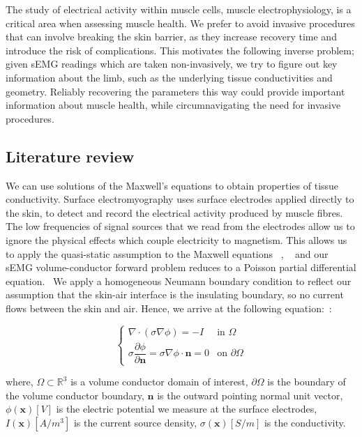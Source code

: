 \documentclass[final-report]{report-template}
\begin{document}
The study of electrical activity within muscle cells, muscle electrophysiology, is a critical area when assessing muscle health. We prefer to avoid invasive procedures that can involve breaking the skin barrier, as they increase recovery time and introduce the risk of complications. This motivates the following inverse problem; given sEMG readings which are taken non-invasively, we try to figure out key information about the limb, such as the underlying tissue conductivities and geometry. Reliably recovering the parameters this way could provide important information about muscle health, while circumnavigating the need for invasive procedures.

\subsection{Literature review}

We can use solutions of the Maxwell's equations to obtain properties of tissue conductivity. Surface electromyography uses surface electrodes applied directly to the skin, to detect and record the electrical activity produced by muscle fibres. The low frequencies of signal sources that we read from the electrodes allow us to ignore the physical effects which couple electricity to magnetism. This allows us to apply the quasi-static assumption to the Maxwell equations ~\cite{plonsey1977}, ~\cite{plonsey1967} and our sEMG volume-conductor forward problem reduces to a Poisson partial differential equation.~\cite{mesin2013} We apply a homogeneous Neumann boundary condition to reflect our assumption that the skin-air interface is the insulating boundary, so no current flows between the skin and air. Hence, we arrive at the following equation:~\cite{maksymenko2023}:

$$
\begin{cases}
\nabla \cdot (\sigma \nabla \phi) = -I & \text{in } \Omega \\
\sigma \dfrac{\partial \phi}{\partial \mathbf{n}}
  = \sigma \nabla \phi \cdot \mathbf{n} = 0 & \text{on } \partial \Omega
\end{cases}
$$

where, \newline
$\Omega \subset \mathbb{R}^3$ is a volume conductor domain of interest, \newline$\partial \Omega$ is the boundary of the volume conductor boundary, \newline $\mathbf{n}$ is the outward pointing normal unit vector, \newline $\phi(\mathbf{x})[V]$ is the electric potential we measure at the surface electrodes, \newline $I(\mathbf{x})[A/m^3]$ is the current source density, \newline $\sigma(\mathbf{x})[S/m]$ is the conductivity.
\end{document}

